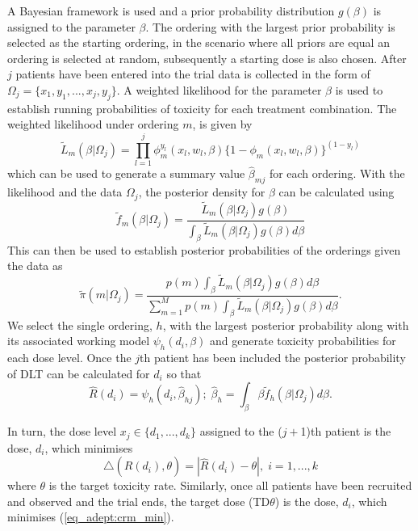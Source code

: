 A Bayesian framework is used and a prior probability distribution $g(\beta)$ is assigned to the parameter $\beta$. The ordering with the largest prior probability is selected as the starting ordering, in the scenario where all priors are equal an ordering is selected at random, subsequently a starting dose is also chosen. After $j$ patients have been entered into the trial data is collected in the form of $\Omega_j = \{x_1,y_1, ..., x_j,y_j\}$. A weighted likelihood for the parameter $\beta$ is used to establish running probabilities of toxicity for each treatment combination. The weighted likelihood under ordering $m$, is given by 
\begin{equation}
\label{eq_adept:likelihood}
\tilde{L}_m(\beta|\Omega_j)=\prod_{l=1}^{j}\phi_m^{y_l}(x_l,w_l,\beta)\{1-\phi_m(x_l,w_l,\beta)\}^{(1-y_l)}
\end{equation} 
which can be used to generate a summary value $\hat{\beta}_{mj}$ for each ordering. With the likelihood and the data $\Omega_j$, the posterior density for $\beta$ can be calculated using 
\begin{equation}
	\tilde{f}_m(\beta|\Omega_j)=\frac{\tilde{L}_m(\beta|\Omega_j)g(\beta)}{\int_{\beta}\tilde{L}_m(\beta|\Omega_j)g(\beta)d\beta}
\end{equation}
This can then be used to establish posterior probabilities of the orderings given the data as 
\begin{equation}
\tilde{\pi}(m|\Omega_j)=\frac{p(m)\int_{\beta}\tilde{L}_m(\beta|\Omega_j)g(\beta)d\beta}{\sum_{m=1}^{M}p(m)\int_{\beta}\tilde{L}_m(\beta|\Omega_j)g(\beta)d\beta}.
\end{equation}
We select the single ordering, $h$, with the largest posterior probability along with its associated working model $\psi_h(d_i,\beta)$ and generate toxicity probabilities for each dose level. Once the $j$th patient has been included the posterior probability of DLT can be calculated for $d_{i}$ so that
\begin{equation}
	\hat{R}(d_i) = \psi_h(d_i,\hat{\beta}_{hj}); \; \hat{\beta}_h = \int_{\beta}\beta\tilde{f}_h(\beta|\Omega_j)d\beta.
\end{equation}

In turn, the dose level $x_j \in \{d_1,...,d_k\}$ assigned to the ($j+$1)th patient is the dose, $d_i$, which minimises 
\begin{equation}
\label{eq_adept:crm_min}
	\triangle(\hat{R}(d_i),\theta) = |\hat{R}(d_i)-\theta|, \; i=1,...,k
\end{equation}
where $\theta$ is the target toxicity rate. Similarly, once all patients have been recruited and observed and the trial ends, the target dose (TD$\theta$) is the dose, $d_{i}$, which minimises (\ref{eq_adept:crm_min}).

